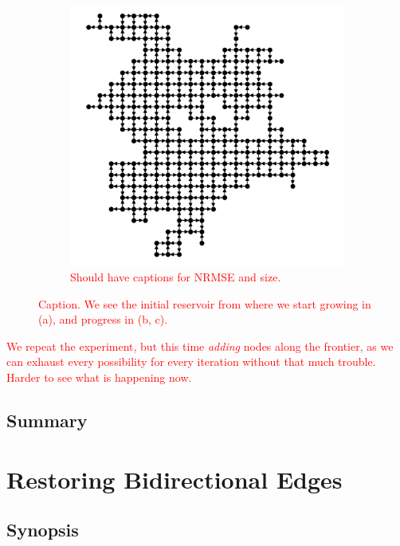 \begin{figure}[t]
\begin{subfigure}{.49\textwidth}
    \includegraphics[width=1.0\linewidth]{figures/sq-grid-grow-250.png}
    \caption{\textcolor{red}{Should have captions for NRMSE and size.}}
    \label{fig:sq-grid-grow-250}
  \end{subfigure}
  \caption{
    \textcolor{red}{
      Caption. We see the initial reservoir from where we start growing in (a),
and progress in (b, c).
    }
  }
  \label{fig:sq-grid-grow}
\end{figure}

\textcolor{red}{
  We repeat the experiment, but this time \textit{adding} nodes along the
frontier, as we can exhaust every possibility for every iteration without that
much trouble. Harder to see what is happening now.
}

\subsection{Summary}

\section{Restoring Bidirectional Edges}

\subsection{Synopsis}

